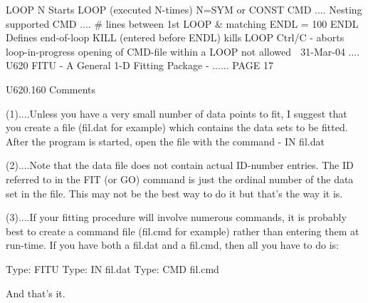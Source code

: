    LOOP N             Starts LOOP (executed N-times) N=SYM or CONST
   CMD  ....          Nesting supported
   CMD  ....          # lines between 1st LOOP & matching ENDL = 100
   ENDL               Defines end-of-loop
                      KILL (entered before ENDL) kills LOOP
                      Ctrl/C - aborts loop-in-progress
                      opening of CMD-file within a LOOP not allowed
    
   31-Mar-04 .... U620  FITU - A General 1-D Fitting Package - ...... PAGE  17
 
 
 
   U620.160  Comments
 
   (1)....Unless  you  have  a  very  small  number  of  data points to fit, I
          suggest that you create a file (fil.dat for example) which  contains
          the  data  sets to be fitted. After the program is started, open the
          file with the command - IN fil.dat
 
   (2)....Note that the data file does not contain actual  ID-number  entries.
          The  ID  referred  to in the FIT (or GO) command is just the ordinal
          number of the data set in the file. This may not be the best way  to
          do it but that's the way it is.
 
   (3)....If  your  fitting  procedure  will  involve numerous commands, it is
          probably best to create a command file (fil.cmd for example)  rather
          than  entering  them  at  run-time. If you have both a fil.dat and a
          fil.cmd, then all you have to do is:
 
   Type:  FITU
   Type:  IN   fil.dat
   Type:  CMD  fil.cmd
 
   And that's it.
